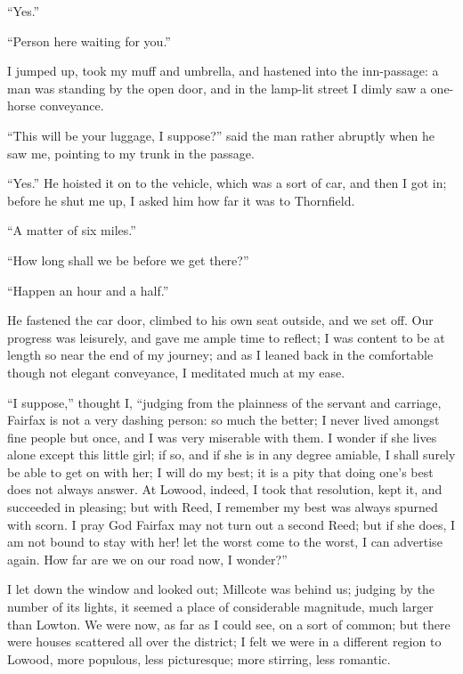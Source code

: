 \enquote{Yes.}

\enquote{Person here waiting for you.}

I jumped up, took my muff and umbrella, and hastened into the
inn-passage: a man was standing by the open door, and in the lamp-lit
street I dimly saw a one-horse conveyance.

\enquote{This will be your luggage, I suppose?} said the man rather
abruptly when he saw me, pointing to my trunk in the passage.

\enquote{Yes.} He hoisted it on to the vehicle, which was a sort of
car, and then I got in; before he shut me up, I asked him how far it was
to Thornfield.

\enquote{A matter of six miles.}

\enquote{How long shall we be before we get there?}

\enquote{Happen an hour and a half.}

He fastened the car door, climbed to his own seat outside, and we set
off. Our progress was leisurely, and gave me ample time to reflect; I
was content to be at length so near the end of my journey; and as I
leaned back in the comfortable though not elegant conveyance, I
meditated much at my ease.

\enquote{I suppose,} thought I, \enquote{judging from the plainness of
the servant and carriage, \Mrs{} Fairfax is not a very dashing person: so
much the better; I never lived amongst fine people but once, and I was
very miserable with them. I wonder if she lives alone except this
little girl; if so, and if she is in any degree amiable, I shall surely
be able to get on with her; I will do my best; it is a pity that doing
one's best does not always answer. At Lowood, indeed, I took that
resolution, kept it, and succeeded in pleasing; but with \Mrs{} Reed, I
remember my best was always spurned with scorn. I pray God \Mrs{} Fairfax
may not turn out a second \Mrs{} Reed; but if she does, I am not bound to
stay with her! let the worst come to the worst, I can advertise again. 
How far are we on our road now, I wonder?}

I let down the window and looked out; Millcote was behind us; judging by
the number of its lights, it seemed a place of considerable magnitude,
much larger than Lowton. We were now, as far as I could see, on a sort
of common; but there were houses scattered all over the district; I felt
we were in a different region to Lowood, more populous, less
picturesque; more stirring, less romantic.

